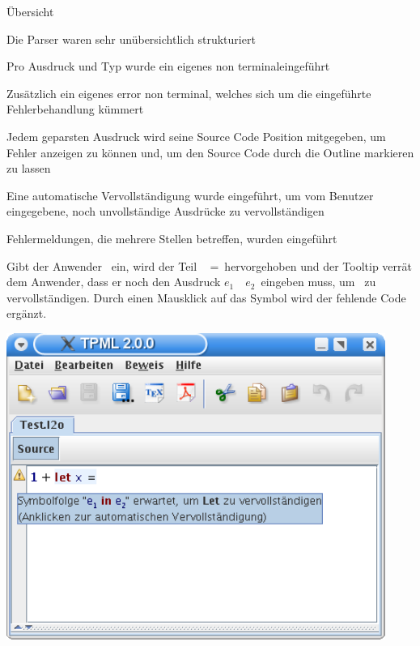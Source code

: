 {
  \begin{itemgroup}{Übersicht}
    \item Die Parser waren sehr unübersichtlich strukturiert
    \item Pro Ausdruck und Typ wurde ein eigenes \glqq non terminal\grqq eingeführt
    \item Zusätzlich ein eigenes \glqq error non terminal\grqq, welches sich um
          die eingeführte Fehlerbehandlung kümmert
    \item Jedem geparsten Ausdruck wird seine Source Code Position mitgegeben, um
          Fehler anzeigen zu können und, um den Source Code durch die Outline
          markieren zu lassen
    \item Eine automatische Vervollständigung wurde eingeführt, um vom Benutzer
          eingegebene, noch unvollständige Ausdrücke zu vervollständigen
    \item Fehlermeldungen, die mehrere Stellen betreffen, wurden eingeführt
  \end{itemgroup}
}

{
  Gibt der Anwender \glqq {}\grqq\ 
  ein, wird der Teil \glqq \KeyLet\  =\grqq\ hervorgehoben und der Tooltip
  verrät dem Anwender, dass er noch den Ausdruck \glqq $e_1$\ \KeyIn\ $e_2$\grqq\ eingeben muss,
  um \glqq{\bf Let}\grqq\ zu vervollständigen. Durch einen Mausklick auf das Symbol wird der
  fehlende Code ergänzt.
  \begin{center}
    \includegraphics[height=10cm]{images/parser_auto.png}
  \end{center}
}

